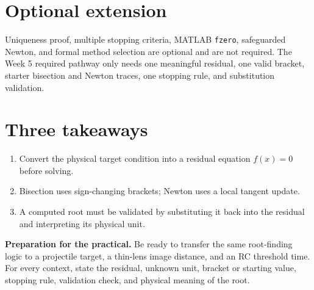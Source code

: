 \documentclass[11pt,a4paper]{article}
\begin{document}
\section*{Optional extension}
Uniqueness proof, multiple stopping criteria, MATLAB \texttt{fzero}, safeguarded Newton, and formal method selection are optional and are not required. The Week 5 required pathway only needs one meaningful residual, one valid bracket, starter bisection and Newton traces, one stopping rule, and substitution validation.

\section*{Three takeaways}
\begin{enumerate}[nosep,leftmargin=6mm]
\item Convert the physical target condition into a residual equation $f(x)=0$ before solving.
\item Bisection uses sign-changing brackets; Newton uses a local tangent update.
\item A computed root must be validated by substituting it back into the residual and interpreting its physical unit.
\end{enumerate}

\begin{keybox}\textbf{Preparation for the practical.} Be ready to transfer the same root-finding logic to a projectile target, a thin-lens image distance, and an RC threshold time. For every context, state the residual, unknown unit, bracket or starting value, stopping rule, validation check, and physical meaning of the root.\end{keybox}
\end{document}

